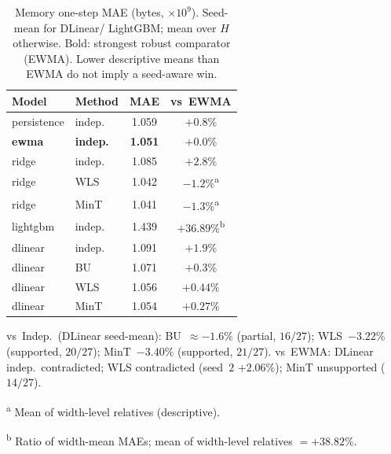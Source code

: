 \begin{table}[width=\columnwidth,pos=!t]
\centering
\caption{Memory one-step MAE (bytes, $\times 10^9$). Seed-mean for DLinear/
LightGBM; mean over $H$ otherwise. Bold: strongest robust comparator ({EWMA}).
Lower descriptive means than {EWMA} do not imply a seed-aware win.}
\label{tab:memory_main}
\begin{threeparttable}
\scriptsize
\setlength{\tabcolsep}{2.5pt}
\begin{tabular*}{\tblwidth}{@{\extracolsep{\fill}}llcc@{}}
\toprule
Model & Method & MAE & vs~{EWMA} \\
\midrule
persistence & indep. & 1.059 & $+0.8\%$ \\
\textbf{ewma} & \textbf{indep.} & \textbf{1.051} & $+0.0\%$ \\
ridge & indep. & 1.085 & $+2.8\%$ \\
ridge & WLS & 1.042 & $-1.2\%$\textsuperscript{a} \\
ridge & MinT & 1.041 & $-1.3\%$\textsuperscript{a} \\
lightgbm & indep. & 1.439 & $+36.89\%$\textsuperscript{b} \\
dlinear & indep. & 1.091 & $+1.9\%$ \\
dlinear & BU & 1.071 & $+0.3\%$ \\
dlinear & WLS & 1.056 & $+0.44\%$ \\
dlinear & MinT & 1.054 & $+0.27\%$ \\
\bottomrule
\end{tabular*}
\begin{tablenotes}
\footnotesize
\item vs~Indep.\ (DLinear seed-mean): BU~$\approx{-}1.6\%$ (partial, $16/27$);
WLS~$-3.22\%$ (supported, $20/27$); MinT~$-3.40\%$ (supported, $21/27$).
vs~{EWMA}: DLinear indep.\ contradicted; {WLS} contradicted (seed~$2$
$+2.06\%$); MinT unsupported ($14/27$).
\item\textsuperscript{a} Mean of width-level relatives (descriptive).
\item\textsuperscript{b} Ratio of width-mean MAEs; mean of width-level
relatives $=+38.82\%$.
\end{tablenotes}
\end{threeparttable}
\end{table}
